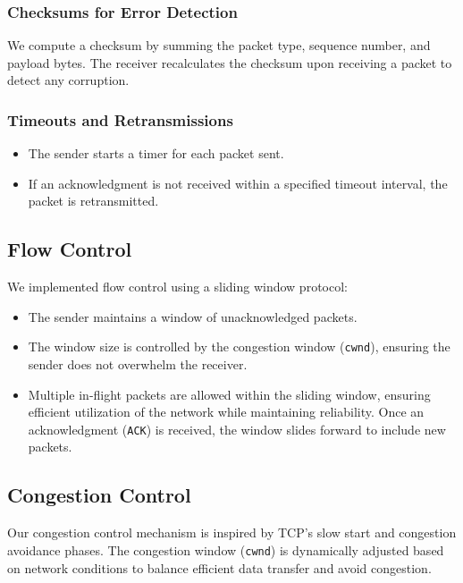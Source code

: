 \documentclass[11pt]{article}
\begin{document}
\subsubsection{Checksums for Error Detection}

We compute a checksum by summing the packet type, sequence number, and payload bytes. The receiver recalculates the checksum upon receiving a packet to detect any corruption.

\subsubsection{Timeouts and Retransmissions}

\begin{itemize}
    \item The sender starts a timer for each packet sent.
    \item If an acknowledgment is not received within a specified timeout interval, the packet is retransmitted.
\end{itemize}

\subsection{Flow Control}

We implemented flow control using a sliding window protocol:

\begin{itemize}
    \item The sender maintains a window of unacknowledged packets.
    \item The window size is controlled by the congestion window (\texttt{cwnd}), ensuring the sender does not overwhelm the receiver.
    \item Multiple in-flight packets are allowed within the sliding window, ensuring efficient utilization of the network while maintaining reliability. Once an acknowledgment (\texttt{ACK}) is received, the window slides forward to include new packets.
\end{itemize}

\subsection{Congestion Control}

Our congestion control mechanism is inspired by TCP's slow start and congestion avoidance phases. The congestion window (\texttt{cwnd}) is dynamically adjusted based on network conditions to balance efficient data transfer and avoid congestion.
\end{document}
